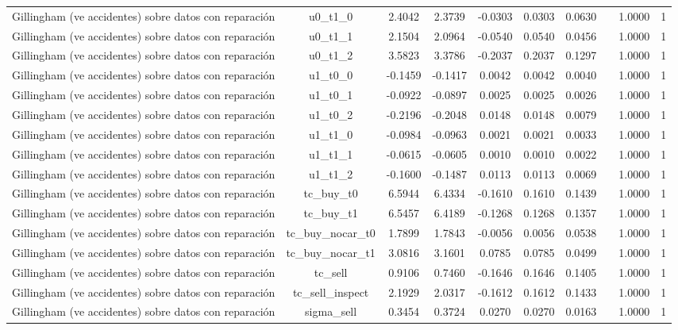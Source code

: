 \begin{table}[htbp]
\begin{tabular}{lccccccccc}
Gillingham (ve accidentes) sobre datos con reparación & u0\_t1\_0 & 2.4042 & 2.3739 & -0.0303 & 0.0303 & 0.0630 &  & 1.0000 & 1 \\
Gillingham (ve accidentes) sobre datos con reparación & u0\_t1\_1 & 2.1504 & 2.0964 & -0.0540 & 0.0540 & 0.0456 &  & 1.0000 & 1 \\
Gillingham (ve accidentes) sobre datos con reparación & u0\_t1\_2 & 3.5823 & 3.3786 & -0.2037 & 0.2037 & 0.1297 &  & 1.0000 & 1 \\
Gillingham (ve accidentes) sobre datos con reparación & u1\_t0\_0 & -0.1459 & -0.1417 & 0.0042 & 0.0042 & 0.0040 &  & 1.0000 & 1 \\
Gillingham (ve accidentes) sobre datos con reparación & u1\_t0\_1 & -0.0922 & -0.0897 & 0.0025 & 0.0025 & 0.0026 &  & 1.0000 & 1 \\
Gillingham (ve accidentes) sobre datos con reparación & u1\_t0\_2 & -0.2196 & -0.2048 & 0.0148 & 0.0148 & 0.0079 &  & 1.0000 & 1 \\
Gillingham (ve accidentes) sobre datos con reparación & u1\_t1\_0 & -0.0984 & -0.0963 & 0.0021 & 0.0021 & 0.0033 &  & 1.0000 & 1 \\
Gillingham (ve accidentes) sobre datos con reparación & u1\_t1\_1 & -0.0615 & -0.0605 & 0.0010 & 0.0010 & 0.0022 &  & 1.0000 & 1 \\
Gillingham (ve accidentes) sobre datos con reparación & u1\_t1\_2 & -0.1600 & -0.1487 & 0.0113 & 0.0113 & 0.0069 &  & 1.0000 & 1 \\
Gillingham (ve accidentes) sobre datos con reparación & tc\_buy\_t0 & 6.5944 & 6.4334 & -0.1610 & 0.1610 & 0.1439 &  & 1.0000 & 1 \\
Gillingham (ve accidentes) sobre datos con reparación & tc\_buy\_t1 & 6.5457 & 6.4189 & -0.1268 & 0.1268 & 0.1357 &  & 1.0000 & 1 \\
Gillingham (ve accidentes) sobre datos con reparación & tc\_buy\_nocar\_t0 & 1.7899 & 1.7843 & -0.0056 & 0.0056 & 0.0538 &  & 1.0000 & 1 \\
Gillingham (ve accidentes) sobre datos con reparación & tc\_buy\_nocar\_t1 & 3.0816 & 3.1601 & 0.0785 & 0.0785 & 0.0499 &  & 1.0000 & 1 \\
Gillingham (ve accidentes) sobre datos con reparación & tc\_sell & 0.9106 & 0.7460 & -0.1646 & 0.1646 & 0.1405 &  & 1.0000 & 1 \\
Gillingham (ve accidentes) sobre datos con reparación & tc\_sell\_inspect & 2.1929 & 2.0317 & -0.1612 & 0.1612 & 0.1433 &  & 1.0000 & 1 \\
Gillingham (ve accidentes) sobre datos con reparación & sigma\_sell & 0.3454 & 0.3724 & 0.0270 & 0.0270 & 0.0163 &  & 1.0000 & 1 \\

\end{tabular}
\end{table}
